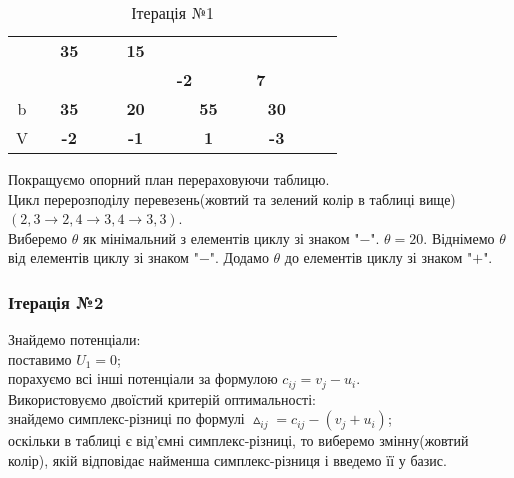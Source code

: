 \documentclass[a4paper, 12pt]{article}
\begin{document}
\begin{table}[H]
\begin{tabular}{|c|cccc|cccc|cccc|cccc|rr|}
\cline{5-5}\cline{9-9}\cline{13-13}\cline{17-17}          &       & \multicolumn{2}{c}{\multirow{2}[2]{*}{\textbf{35}}} &       &       & \multicolumn{2}{c}{\multirow{2}[2]{*}{\textbf{15}}} &       &       & \multicolumn{2}{c}{\multirow{2}[2]{*}{}} &       &       & \multicolumn{2}{c}{\multirow{2}[2]{*}{}} &       & \multicolumn{1}{c|}{} &  \bigstrut[t]\\
          &       & \multicolumn{2}{c}{} &       &       & \multicolumn{2}{c}{} &       &       & \multicolumn{2}{c}{} &       &       & \multicolumn{2}{c}{} &       & \multicolumn{1}{c|}{} &  \bigstrut[b]\\
\cline{2-2}\cline{6-6}\cline{10-10}\cline{14-14}          & \multicolumn{1}{c|}{} &       &       &       & \multicolumn{1}{c|}{} & \multicolumn{2}{c}{} &       & \multicolumn{1}{c|}{\textbf{-2}} &       &       &       & \multicolumn{1}{c|}{\textbf{7}} & \multicolumn{2}{c}{} &       & \multicolumn{1}{c|}{} &  \bigstrut\\
    \hline
    b     & \multicolumn{4}{c|}{\textbf{35}} & \multicolumn{4}{c|}{\textbf{20}} & \multicolumn{4}{c|}{\textbf{55}} & \multicolumn{4}{c|}{\textbf{30}} &       &  \bigstrut\\
\cline{1-17}    V     & \multicolumn{4}{c|}{\textbf{-2}} & \multicolumn{4}{c|}{\textbf{-1}} & \multicolumn{4}{c|}{\textbf{1}} & \multicolumn{4}{c|}{\textbf{-3}} &       &  \bigstrut\\
    \hline
    \end{tabular}%
  \caption{Ітерація №1}
  \label{tab:it1}%
\end{table}%

Покращуємо опорний план перераховуючи таблицю.\\

Цикл перерозподілу перевезень(жовтий та зелений колір в таблиці вище) $(2,3 \longrightarrow 2,4 \longrightarrow 3,4 \longrightarrow 3,3)$.\\

Виберемо $\theta$ як мінімальний з елементів циклу зі знаком "$-$". $\theta = 20$. Віднімемо $\theta$ від елементів циклу зі знаком "$-$". Додамо $\theta$ до елементів циклу зі знаком "$+$".

\subsubsection{Ітерація №2}

Знайдемо потенціали:\\
поставимо $U_1 = 0$;\\
порахуємо всі інші потенціали за формулою $c_{ij} = v_j - u_i$.\\
Використовуємо двоїстий критерій оптимальності:\\
знайдемо симплекс-різниці по формулі $\vartriangle_{ij} = c_{ij} - (v_j + u_i) $;\\
оскільки в таблиці є від'ємні симплекс-різниці, то виберемо змінну(жовтий колір), якій відповідає найменша симплекс-різниця і введемо її у базис.
\end{document}
